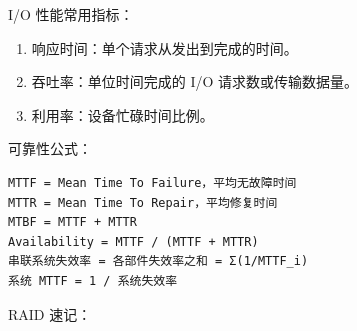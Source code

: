 \documentclass[
]{ctexart}
\providecommand{\tightlist}{%
  \setlength{\itemsep}{0pt}\setlength{\parskip}{0pt}}
\begin{document}
I/O 性能常用指标：

\begin{enumerate}
\def\labelenumi{\arabic{enumi}.}
\tightlist
\item
  响应时间：单个请求从发出到完成的时间。
\item
  吞吐率：单位时间完成的 I/O 请求数或传输数据量。
\item
  利用率：设备忙碌时间比例。
\end{enumerate}

可靠性公式：

\begin{lstlisting}
MTTF = Mean Time To Failure，平均无故障时间
MTTR = Mean Time To Repair，平均修复时间
MTBF = MTTF + MTTR
Availability = MTTF / (MTTF + MTTR)
串联系统失效率 = 各部件失效率之和 = Σ(1/MTTF_i)
系统 MTTF = 1 / 系统失效率
\end{lstlisting}

RAID 速记：
\end{document}
